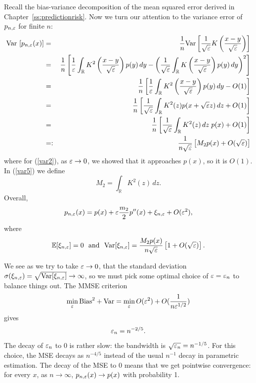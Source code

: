 Recall the bias-variance decomposition of the mean squared error derived in Chapter~\ref{ss:predictionrisk}.
Now we turn our attention to the variance error of $p_{n,\varepsilon}$ for finite $n$:
\begin{eqnarray}
\text{Var }[p_{n,\varepsilon}(x)] &=& \frac{1}{n} \text{Var}\left[\frac{1}{\sqrt{\varepsilon}} K\left( \frac{x-y}{\sqrt{\varepsilon}}\right) \right] \nonumber\\
&=& \frac{1}{n} \left[ \frac{1}{\varepsilon} \int_\mathbb{R} K^2\left(\frac{x-y}{\sqrt{\varepsilon}}\right)p(y)\,dy - \left(\frac{1}{\sqrt{\varepsilon}} \int_\mathbb{R} K\left(\frac{x-y}{\sqrt{\varepsilon}}\right)p(y)\,dy\right)^2\right] \nonumber \\
&=& \frac{1}{n} \left[ \frac{1}{\varepsilon} \int_\mathbb{R} K^2\left(\frac{x-y}{\sqrt{\varepsilon}}\right)p(y)\,dy - O(1) \right] \label{var2}\\
&=& \frac{1}{n} \left[ \frac{1}{\sqrt{\varepsilon}}\int_\mathbb{R} K^2(z)p(x+\sqrt{\varepsilon}z)\,dz + O(1) \right] \nonumber\\
&=& \frac{1}{n} \left[ \frac{1}{\sqrt{\varepsilon}}\int_\mathbb{R} K^2(z)\,dz \;p(x) + O(1) \right] \nonumber\\
&=:& \frac{1}{n\sqrt{\varepsilon}} \left[M_2 p(x) + O(\sqrt{\varepsilon})\right]\label{var5}
\end{eqnarray}
where for (\ref{var2}), as $\varepsilon \rightarrow 0$, we showed that it approaches $p(x)$, so it is $O(1)$.
In (\ref{var5}) we define
$$M_2 = \int_\mathbb{R} K^2(z)\,dz.$$
Overall,
\begin{equation}
\label{eq:density_estimation_MSE}
p_{n,\varepsilon}(x) = p(x) + \varepsilon \frac{m_2}{2} p^{\prime\prime} (x) + \xi_{n,\varepsilon} + O(\varepsilon^2),
\end{equation}
where
$$
\mathbb{E}[\xi_{n,\varepsilon}] = 0 \,\,\text{ and }\,\, \text{Var}[\xi_{n,\varepsilon}] = \frac{M_2 p(x)}{n\sqrt{\varepsilon}}\left[1 + O(\sqrt{\varepsilon})\right].
$$

We see as we try to take $\varepsilon \rightarrow 0$, that the standard deviation $\sigma(\xi_{n,\varepsilon}) = \sqrt{\text{Var}[\xi_{n,\varepsilon}]} \rightarrow \infty$, so we must pick some optimal choice of $\varepsilon = \varepsilon_n$ to balance things out. The MMSE criterion
$$\min_{\varepsilon} \text{Bias}^2 + \text{Var} = \min_{\varepsilon} O(\varepsilon^2) + O(\frac{1}{n\varepsilon^{1/2}})$$
gives
$$\varepsilon_n = n^{-2/5}.$$
The decay of $\varepsilon_n$ to 0 is rather slow: the bandwidth is $\sqrt{\varepsilon_n} = n^{-1/5}$. For this choice, the MSE decays as $n^{-4/5}$ instead of the usual $n^{-1}$ decay in parametric estimation. The decay of the MSE to 0 means that we get pointwise convergence: for every $x$, as $n\to \infty$, $p_{n,\varepsilon}(x)\to p(x)$ with probability 1.





